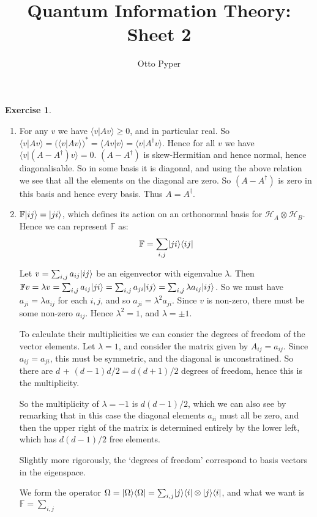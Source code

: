 \documentclass[]{article}
\title{Quantum Information Theory: Sheet 2}
\author{Otto Pyper}
\date{}
\renewcommand{\H}{\mathcal{H}}
\begin{document}
\maketitle

\textbf{Exercise 1}.

\begin{enumerate}
    \item For any $v$ we have $\langle v|Av\rangle  \ge 0$, and in particular real. So $\langle v|Av \rangle = (\langle v | Av \rangle)^\ast = \langle Av|v\rangle = \langle v | A^\dagger v\rangle$. Hence for all $v$ we have $\langle v | (A - A^\dagger)v\rangle = 0$. $(A-A^\dagger)$ is skew-Hermitian and hence normal, hence diagonalisable. So in some basis it is diagonal, and using the above relation we see that all the elements on the diagonal are zero. So $(A - A^\dagger)$ is zero in this basis and hence every basis. Thus $A = A^\dagger$.
    
    \item $\mathbb{F}\lvert ij\rangle = \lvert ji\rangle$, which defines its action on an orthonormal basis for $\H_A\otimes \H_B$. Hence we can represent $\mathbb{F}$ as: $$\mathbb{F} = \sum_{i,j}\lvert ji\rangle\langle ij\rvert$$
    
    Let $v = \sum_{i,j}a_{ij}\lvert ij\rangle$ be an eigenvector with eigenvalue $\lambda$. Then $\mathbb{F}v = \lambda v = \sum_{i,j}a_{ij}\lvert ji\rangle = \sum_{i,j}a_{ji}\lvert ij\rangle = \sum_{i,j}\lambda a_{ij}\lvert ij\rangle$. So we must have $a_{ji} = \lambda a_{ij}$ for each $i,j$, and so $a_{ji} = \lambda^2 a_{ji}$. Since $v$ is non-zero, there must be some non-zero $a_{ij}$. Hence $\lambda^2 = 1$, and $\lambda = \pm 1$.

    To calculate their multiplicities we can consier the degrees of freedom of the vector elements. Let $\lambda = 1$, and consider the matrix given by $A_{ij} = a_{ij}$. Since $a_{ij} = a_{ji}$, this must be symmetric, and the diagonal is unconstratined. So there are $d$ + $(d-1)d/2 = d(d+1)/2$ degrees of freedom, hence this is the multiplicity.

    So the multiplicity of $\lambda = -1$ is $d(d-1)/2$, which we can also see by remarking that in this case the diagonal elements $a_{ii}$ must all be zero, and then the upper right of the matrix is determined entirely by the lower left, which has $d(d-1)/2$ free elements.

    Slightly more rigorously, the `degrees of freedom' correspond to basis vectors in the eigenspace.

    We form the operator $\Omega = \lvert\Omega\rangle\langle\Omega\rvert = \sum_{i,j}\lvert j\rangle\langle i\rvert\otimes\lvert j\rangle\langle i\rvert$, and what we want is $\mathbb{F} = \sum_{i,j}$
\end{enumerate}
\end{document}
